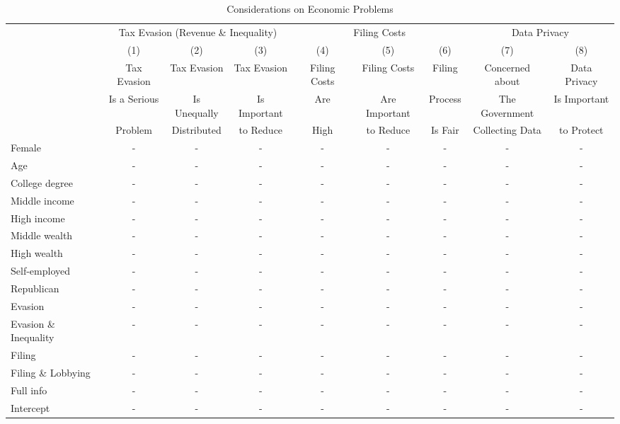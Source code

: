 \documentclass[11pt]{article}
\begin{document}
\begin{landscape}
\begin{table}[!htbp]\centering
\caption{Considerations on Economic Problems}
\label{tab:considerationseconomicproblems}
\begin{threeparttable}
\begin{tabular}{l||ccc||ccc||cc}
\toprule
 & \multicolumn{3}{c||}{Tax Evasion (Revenue \& Inequality)} & \multicolumn{3}{c||}{Filing Costs} & \multicolumn{2}{c}{Data Privacy}\\[0.5em]
  &(1)  &(2) & (3) & (4)  & (5) & (6) & (7) & (8) \\[0.25em]
  & Tax Evasion & Tax Evasion & Tax Evasion & Filing Costs & Filing Costs & Filing & Concerned about & Data Privacy \\  
 & Is a Serious &Is Unequally & Is Important & Are & Are Important & Process  & The Government & Is Important  \\
  &  Problem & Distributed & to Reduce & High& to Reduce & Is Fair & Collecting Data & to Protect  \\
\midrule
Female                     &-& - & - &-& - & - &- &- \\
Age                        &-& - & - &-& - & - &- &- \\
College degree                     &-& - & - &-& - & - &- &-\\
Middle income                      &-& - & - &-& - & - &- &-\\
High income                        &-& - & - &-& - & - &- &-\\
Middle wealth                      &-& - & - &-& - & - &- &-\\
High wealth                        &-& - & - &-& - & - &- &-\\
Self-employed                      &-& - & - &-& - & - &- &-\\
Republican                         &-& - & - &-& - & - &- &-\\[0.5em]
Evasion                 & - & - & - & - & - & - & -  &-\\
Evasion \& Inequality     & - & - & - & - & - & - & -  &-\\
Filing                   & - & - & - & - & - & - & -  &-\\
Filing \& Lobbying         & - & - & - & - & - & - & -  &-\\
Full info               & - & - & - & - & - & - & -  &-\\[0.5em]
Intercept &- &- &- &- &- &- &- &-\\

\end{tabular}
\end{threeparttable}
\end{table}
\end{landscape}
\end{document}
